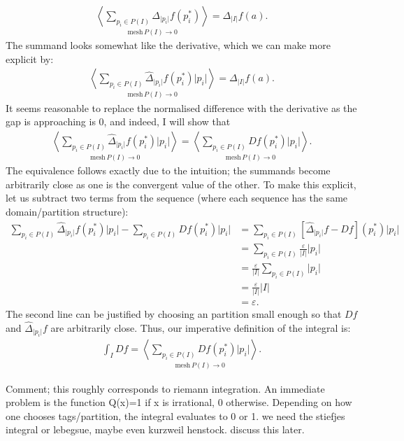 \documentclass{article}
\newcommand{\seq}[2]{\underset{#2}{\left\langle #1\right\rangle}}
\theoremstyle{definition}
\begin{document}
\begin{align*}
	\seq{\sum_{p_i\in P(I)}\Delta_{\lvert p_i\rvert}f(p_i^*)}{\text{mesh}\,P(I)\rightarrow0}=\Delta_{\lvert I\rvert}f(a).
\end{align*}
The summand looks somewhat like the derivative, which we can make more explicit by:
\begin{align*}
	\seq{\sum_{p_i\in P(I)}\hat\Delta_{\lvert p_i\rvert}f(p_i^*)\lvert p_i\rvert}{\text{mesh}\,P(I)\rightarrow0}=\Delta_{\lvert I\rvert}f(a).
\end{align*}
It seems reasonable to replace the normalised difference with the derivative as the gap is approaching is 0, and indeed, I will show that 
\begin{align*}
	\seq{\sum_{p_i\in P(I)}\hat\Delta_{\lvert p_i\rvert}f(p_i^*)\lvert p_i\rvert}{\text{mesh}\,P(I)\rightarrow0}=\seq{\sum_{p_i\in P(I)}Df(p_i^*)\lvert p_i\rvert}{\text{mesh}\,P(I)\rightarrow0}.
\end{align*}
The equivalence follows exactly due to the intuition; the summands become arbitrarily close as one is the convergent value of the other. To make this explicit, let us subtract two terms from the sequence (where each sequence has the same domain/partition structure):
\begin{align*}
	\sum_{p_i\in P(I)}\hat\Delta_{\lvert p_i\rvert}f(p_i^*)\lvert p_i\rvert-\sum_{p_i\in P(I)}Df(p_i^*)\lvert p_i\rvert&=\sum_{p_i\in P(I)}\left[\hat\Delta_{\lvert p_i\rvert}f-Df\right](p_i^*)\lvert p_i\rvert\\
	&=\sum_{p_i\in P(I)}\frac{\varepsilon}{\lvert I\rvert}\lvert p_i\rvert\\
	&=\frac{\varepsilon}{\lvert I\rvert}\sum_{p_i\in P(I)}\lvert p_i\rvert\\
	&=\frac{\varepsilon}{\lvert I\rvert}\lvert I\rvert\\
	&=\varepsilon.
\end{align*}
The second line can be justified by choosing an partition small enough so that $Df$ and $\hat\Delta_{\lvert p_i\rvert}f$ are arbitrarily close.
Thus, our imperative definition of the integral is:
\begin{align*}
	\int_IDf=\seq{\sum_{p_i\in P(I)}Df(p_i^*)\lvert p_i\rvert}{\text{mesh}\,P(I)\rightarrow0}.
\end{align*}

Comment; this roughly corresponds to riemann integration. An immediate problem is the function Q(x)=1 if x is irrational, 0 otherwise. Depending on how one chooses tags/partition, the integral evaluates to 0 or 1. we need the stiefjes integral or lebegsue, maybe even kurzweil henstock. discuss this later.
\end{document}
